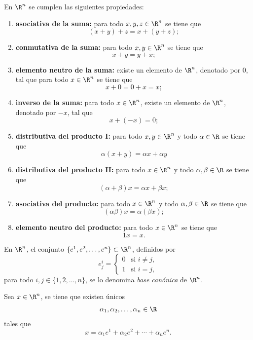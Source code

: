 \documentclass[a4,11pt]{aleph-notas}
\begin{document}
\begin{teo}
    En $\R^n$ se cumplen las siguientes propiedades:
    \begin{enumerate}
    \item \textbf{asociativa de la suma:}
        para todo $x,y,z\in \R^n$ se tiene que
        \[
            (x + y) + z = x + (y + z);
        \]
    \item \textbf{conmutativa de la suma:}
        para todo $x,y\in \R^n$ se tiene que
        \[
            x + y = y + x;
        \]
    \item \textbf{elemento neutro de la suma:}
        existe un elemento de $\R^n$, denotado por $0$, tal que para todo $x\in \R^n$ se tiene que 
        \[
            x + 0 = 0 + x = x;
        \]
    \item \textbf{inverso de la suma:}
        para todo $x\in\R^n$, existe un elemento de $\R^n$, denotado por $-x$, tal que
        \[
            x + (-x)= 0;
        \]
    \item \textbf{distributiva del producto I:}
        para todo $x,y\in\R^n$ y todo $\alpha\in \R$ se tiene que
        \[
            \alpha (x + y)=\alpha x + \alpha y
        \]
    \item \textbf{distributiva del producto II:}
        para todo $x\in\R^n$ y todo $\alpha,\beta\in \R$ se tiene que
        \[
            (\alpha+\beta) x=\alpha x + \beta x;
        \]
    \item \textbf{asociativa del producto:}
        para todo $x\in\R^n$ y todo $\alpha,\beta\in \R$ se tiene que
        \[
            (\alpha\beta) x=\alpha(\beta x);
        \]
    \item \textbf{elemento neutro del producto:}
        para todo $x\in\R^n$ se tiene que
        \[
            1 x=x.
        \]
    \end{enumerate}
\end{teo}

\begin{defi}
    En $\R^n$, el conjunto $\{e^1,e^2,\ldots,e^n\}\subset\R^n$, definidos por 
    \[
        e^i_j=
        \begin{cases}
            0& \text{si }i\neq j,\\
            1& \text{si }i= j,
        \end{cases}
    \]
    para todo $i,j\in\{1,2,\ldots,n\}$, se lo denomina \emph{base canónica} de $\R^n$.
\end{defi}

\begin{teo}
    Sea $x\in\R^n$, se tiene que existen únicos
    \[
        \alpha_1,\alpha_2,\ldots,\alpha_n\in\R
    \]
    tales que
    \[
        x = \alpha_1e^1 + \alpha_2 e^2 + \cdots + \alpha_n e^n.
    \]
\end{teo}
\end{document}
